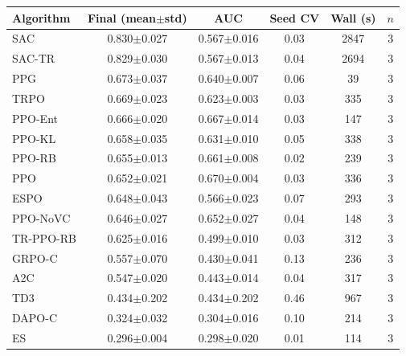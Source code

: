 \begin{tabular}{lccccc}
\toprule
Algorithm & Final (mean$\pm$std) & AUC & Seed CV & Wall (s) & $n$ \\
\midrule
SAC & 0.830$\pm$0.027 & 0.567$\pm$0.016 & 0.03 & 2847 & 3 \\
SAC-TR & 0.829$\pm$0.030 & 0.567$\pm$0.013 & 0.04 & 2694 & 3 \\
PPG & 0.673$\pm$0.037 & 0.640$\pm$0.007 & 0.06 & 39 & 3 \\
TRPO & 0.669$\pm$0.023 & 0.623$\pm$0.003 & 0.03 & 335 & 3 \\
PPO-Ent & 0.666$\pm$0.020 & 0.667$\pm$0.014 & 0.03 & 147 & 3 \\
PPO-KL & 0.658$\pm$0.035 & 0.631$\pm$0.010 & 0.05 & 338 & 3 \\
PPO-RB & 0.655$\pm$0.013 & 0.661$\pm$0.008 & 0.02 & 239 & 3 \\
PPO & 0.652$\pm$0.021 & 0.670$\pm$0.004 & 0.03 & 336 & 3 \\
ESPO & 0.648$\pm$0.043 & 0.566$\pm$0.023 & 0.07 & 293 & 3 \\
PPO-NoVC & 0.646$\pm$0.027 & 0.652$\pm$0.027 & 0.04 & 148 & 3 \\
TR-PPO-RB & 0.625$\pm$0.016 & 0.499$\pm$0.010 & 0.03 & 312 & 3 \\
GRPO-C & 0.557$\pm$0.070 & 0.430$\pm$0.041 & 0.13 & 236 & 3 \\
A2C & 0.547$\pm$0.020 & 0.443$\pm$0.014 & 0.04 & 317 & 3 \\
TD3 & 0.434$\pm$0.202 & 0.434$\pm$0.202 & 0.46 & 967 & 3 \\
DAPO-C & 0.324$\pm$0.032 & 0.304$\pm$0.016 & 0.10 & 214 & 3 \\
ES & 0.296$\pm$0.004 & 0.298$\pm$0.020 & 0.01 & 114 & 3 \\
\bottomrule
\end{tabular}